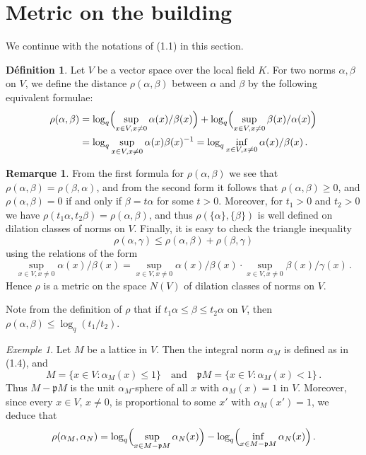 \documentclass[12pt,a4paper]{article}
\theoremstyle{plain}
\theoremstyle{definition}
\newtheorem{definition}{D\'efinition}[section]
\newtheorem{remark}{Remarque}[section]
\theoremstyle{remark}
\newtheorem{example}{Exemple}[section]
\begin{document}
\section{Metric on the building}

We continue with the notations of (1.1) in this section.

\begin{definition}
Let $V$ be a vector space over the local field $K$. For two norms 
$\alpha, \beta$ on $V$, we define the distance $\rho(\alpha,\beta)$ between 
$\alpha$ and $\beta$ by the following equivalent formulae:
\begin{align*}
\rho(\alpha,\beta) &= \log_q\Bigl(\sup_{x \in V, x \neq 0} \alpha(x)/\beta(x)\Bigr) + \log_q\Bigl(\sup_{x \in V, x \neq 0} \beta(x)/\alpha(x)\Bigr) \\
&= \log_q\sup_{x \in V, x \neq 0} \alpha(x)\beta(x)^{-1} = \log_q \inf_{x \in V, x \neq 0} \alpha(x)/\beta(x) \,.
\end{align*}
\end{definition}

\begin{remark}
From the first formula for $\rho(\alpha,\beta)$ we see that 
$\rho(\alpha,\beta) = \rho(\beta,\alpha)$, and from the second form it follows 
that $\rho(\alpha,\beta) \geqslant 0$, and $\rho(\alpha,\beta) = 0$ if and only if 
$\beta = t\alpha$ for some $t > 0$. Moreover, for $t_1 > 0$ and $t_2 > 0$ we 
have $\rho(t_1\alpha, t_2\beta) = \rho(\alpha,\beta)$, and thus 
$\rho(\{\alpha\}, \{\beta\})$ is well defined on dilation classes of norms on 
$V$. Finally, it is easy to check the triangle inequality
\[
\rho(\alpha,\gamma) \leqslant \rho(\alpha,\beta) + \rho(\beta,\gamma)
\]
using the relations of the form
\[
\sup_{x \in V, x \neq 0} \alpha(x)/\beta(x) = \sup_{x \in V, x \neq 0} \alpha(x)/\beta(x) \cdot \sup_{x \in V, x \neq 0} \beta(x)/\gamma(x) \,.
\]
Hence $\rho$ is a metric on the space $N(V)$ of dilation classes of norms on 
$V$.

Note from the definition of $\rho$ that if $t_1\alpha \leqslant \beta \leqslant t_2\alpha$ 
on $V$, then $\rho(\alpha,\beta) \leqslant \log_q(t_1/t_2)$.
\end{remark}

\begin{example}
Let $M$ be a lattice in $V$. Then the integral norm $\alpha_M$ is defined as 
in (1.4), and
\[
M = \{x \in V : \alpha_M(x) \leqslant 1\} \quad\text{and}\quad \mathfrak{p}M = \{x \in V : \alpha_M(x) < 1\} \,.
\]
Thus $M - \mathfrak{p}M$ is the unit $\alpha_M$-sphere of all $x$ with 
$\alpha_M(x) = 1$ in $V$. Moreover, since every $x \in V$, $x \neq 0$, is 
proportional to some $x'$ with $\alpha_M(x') = 1$, we deduce that
\[
\rho(\alpha_M, \alpha_N) = \log_q\Bigl(\sup_{x \in M-\mathfrak{p}M} \alpha_N(x)\Bigr) - \log_q\Bigl(\inf_{x \in M-\mathfrak{p}M} \alpha_N(x)\Bigr) \,.
\]
\end{example}
\end{document}
